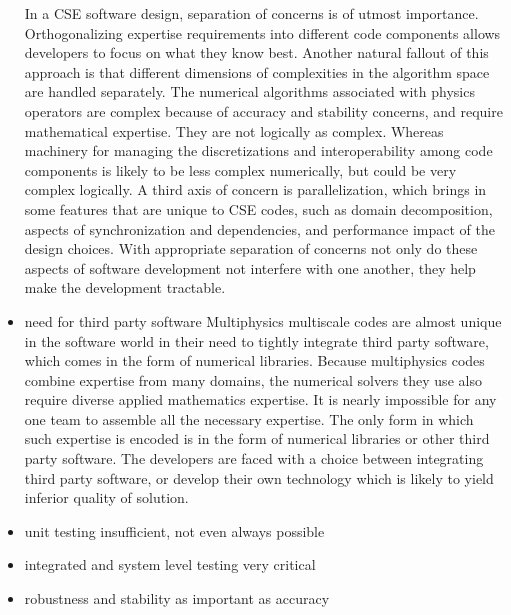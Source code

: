 \begin{itemize}
In a CSE software design, separation of concerns is of utmost
importance. Orthogonalizing expertise requirements into different code
components allows developers to focus on what they know best.  
Another natural fallout of this approach is that different dimensions of
complexities in the algorithm space are handled separately. The
numerical algorithms associated with physics operators are complex
because of accuracy and stability concerns, and require mathematical
expertise. They are not logically as complex. Whereas machinery for
managing the discretizations and interoperability among code
components is likely to be less complex numerically, but could be very
complex logically. A third axis of concern is parallelization, which
brings in some features that are unique to CSE codes, such as domain
decomposition, aspects of synchronization and dependencies, and
performance impact of the design choices. With appropriate separation
of concerns not only do these aspects of software development not 
interfere with one another, they help make the development tractable. 

\item need for third party software 
Multiphysics multiscale codes are almost unique in the software world
in their need to tightly integrate third party software, which comes
in the form of numerical libraries. Because multiphysics codes combine
expertise from many domains, the numerical solvers they use also
require diverse applied mathematics expertise. It is nearly impossible
for any one team to assemble all the necessary expertise. The only
form in which such expertise is encoded is in the form of numerical
libraries or other third party software. The developers are faced with
a choice between integrating third party software, or develop their
own technology which is likely to yield inferior quality of solution. 

\item unit testing insufficient, not even always possible
\item integrated and system level testing very critical
\item robustness and stability as important as accuracy



\end{itemize}
